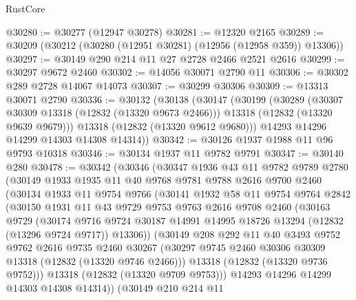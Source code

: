 \begin{lexlean}{RustCore}
\begin{coremodule}
@30280 := @30277 (@12947 @30278)
@30281 := @12320 @2165
@30289 := @30209 (@30212 (@30280 (@12951 @30281) (@12956 (@12958 @359)) @13306))
@30297 := @30149 @290 @214 @11 @27 @2728 @2466 @2521 @2616
@30299 := @30297 @9672 @2460
@30302 := @14056 @30071 @2790 @11
@30306 := @30302 @289 @2728 @14067 @14073
@30307 := @30299 @30306
@30309 := @13313 @30071 @2790
@30336 := @30132
    (@30138
      (@30147
        (@30199
          (@30289
            (@30307 @30309 @13318 (@12832 (@13320 @9673 @2466)))
            @13318
            (@12832 (@13320 @9639 @9679)))
          @13318
          (@12832 (@13320 @9612 @9680)))
        @14293
        @14296
        @14299
        @14303
        @14308
        @14314))
@30342 := @30126 @1937 @1988 @11 @96 @9793 @10318
@30346 := @30134 @1937 @11 @9782 @9791
@30347 := @30140 @280
@30478 := @30342
    (@30346
      (@30347
        @1936
        @43
        @11
        @9782
        @9789
        @2780
        (@30149
          @1933
          @1935
          @11
          @40
          @9768
          @9781
          @9788
          @2616
          @9700
          @2460
          (@30134
            @1933
            @11
            @9754
            @9766
            (@30141
              @1932
              @58
              @11
              @9754
              @9764
              @2842
              (@30150
                @1931
                @11
                @43
                @9729
                @9753
                @9763
                @2616
                @9708
                @2460
                (@30163
                  @9729
                  (@30174
                    @9716
                    @9724
                    @30187
                    @14991
                    @14995
                    @18726
                    @13294
                    (@12832 (@13296 @9724 @9717))
                    @13306))
                (@30149
                  @208
                  @292
                  @11
                  @40
                  @3493
                  @9752
                  @9762
                  @2616
                  @9735
                  @2460
                  @30267
                  (@30297 @9745 @2460 @30306 @30309 @13318 (@12832 (@13320 @9746 @2466)))
                  @13318
                  (@12832 (@13320 @9736 @9752)))
                @13318
                (@12832 (@13320 @9709 @9753)))
              @14293
              @14296
              @14299
              @14303
              @14308
              @14314))
          (@30149
            @210
            @214
            @11

\end{coremodule}
\end{lexlean}
